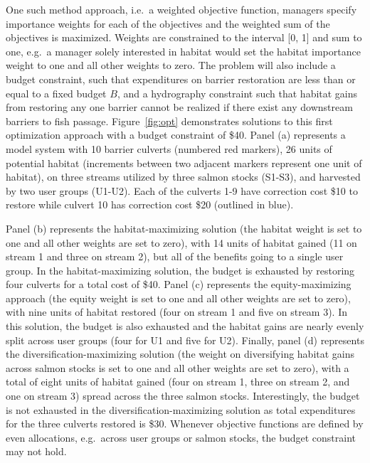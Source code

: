 \documentclass[12pt]{elsarticle}
\begin{document}
One such method approach, i.e.\ a weighted objective function, managers specify importance weights for each of the objectives and the weighted sum of the objectives is maximized. Weights are constrained to the interval [0, 1] and sum to one, e.g.\ a manager solely interested in habitat would set the habitat importance weight to one and all other weights to zero. The problem will also include a budget constraint, such that expenditures on barrier restoration are less than or equal to a fixed budget $B$, and a hydrography constraint such that habitat gains from restoring any one barrier cannot be realized if there exist any downstream barriers to fish passage. Figure~\ref{fig:opt} demonstrates solutions to this first optimization approach with a budget constraint of \$40. Panel (a) represents a model system with 10 barrier culverts (numbered red markers), 26 units of potential habitat (increments between two adjacent markers represent one unit of habitat), on three streams utilized by three salmon stocks (S1-S3), and harvested by two user groups (U1-U2). Each of the culverts 1-9 have correction cost \$10 to restore while culvert 10 has correction cost \$20 (outlined in blue).



Panel (b) represents the habitat-maximizing solution (the habitat weight is set to one and all other weights are set to zero), with 14 units of habitat gained (11 on stream 1 and three on stream 2), but all of the benefits going to a single user group. In the habitat-maximizing solution, the budget is exhausted by restoring four culverts for a total cost of \$40. Panel (c) represents the equity-maximizing approach (the equity weight is set to one and all other weights are set to zero), with nine units of habitat restored (four on stream 1 and five on stream 3). In this solution, the budget is also exhausted and the habitat gains are nearly evenly split across user groups (four for U1 and five for U2). Finally, panel (d) represents the diversification-maximizing solution (the weight on diversifying habitat gains across salmon stocks is set to one and all other weights are set to zero), with a total of eight units of habitat gained (four on stream 1, three on stream 2, and one on stream 3) spread across the three salmon stocks. Interestingly, the budget is not exhausted in the diversification-maximizing solution as total expenditures for the three culverts restored is \$30. Whenever objective functions are defined by even allocations, e.g.\ across user groups or salmon stocks, the budget constraint may not hold. 
\end{document}
